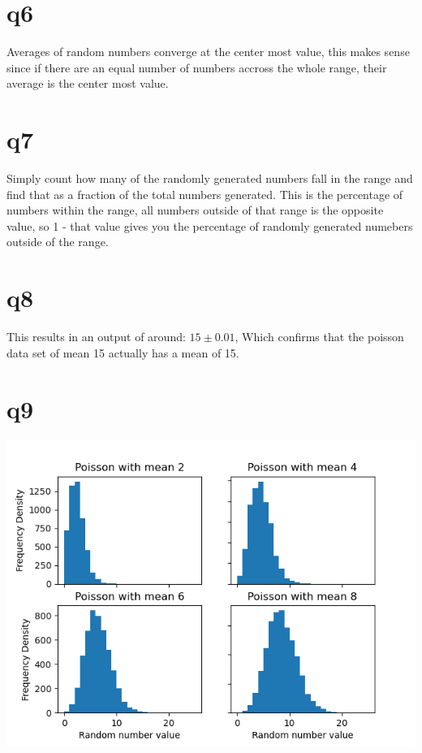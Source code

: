 \documentclass[a4paper,english]{article}
\begin{document}
    \section{q6}
        Averages of random numbers converge at the center most value, this makes sense since if there are an equal number of 
        numbers accross the whole range, their average is the center most value.
        \\
    \section{q7}
        
        
        Simply count how many of the randomly generated numbers fall in the range and find that as a fraction of the total numbers
        generated. This is the percentage of numbers within the range, all numbers outside of that range is the opposite value, so 1 - that value
        gives you the percentage of randomly generated numebers outside of the range.
        \\
    \section{q8}
        
        This results in an output of around:
        $15\pm0.01$,
        Which confirms that the poisson data set of mean 15 actually has a mean of 15.
        \\
    \section{q9}
        
        \includegraphics[scale=0.8]{q5_9.png}
        \\
\end{document}

